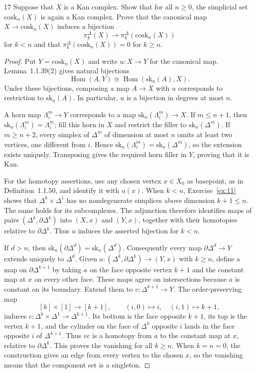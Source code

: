 \begin{exercise}{17}
Suppose that $X$ is a Kan complex. Show that for all $n\ge0$, the
simplicial set $\mathrm{cosk}_n(X)$ is again a Kan complex. Prove that
the canonical map $X\to\mathrm{cosk}_n(X)$ induces a bijection
\[
 \pi_k^\Delta(X)\to\pi_k^\Delta(\mathrm{cosk}_n(X))
\]
for $k<n$ and that $\pi_k^\Delta(\mathrm{cosk}_n(X))=0$ for $k\ge n$.

\begin{proof}
Put $Y=\mathrm{cosk}_n(X)$ and write $u\colon X\to Y$ for the
canonical map. Lemma~1.1.39(2) gives natural bijections
\[
 \operatorname{Hom}(A,Y)\cong
 \operatorname{Hom}(\mathrm{sk}_n(A),X).
\]
Under these bijections, composing a map $A\to X$ with $u$
corresponds to restriction to $\mathrm{sk}_n(A)$. In particular,
$u$ is a bijection in degrees at most $n$.

A horn map $\Lambda_i^m\to Y$ corresponds to a map
$\mathrm{sk}_n(\Lambda_i^m)\to X$.
If $m\le n+1$, then $\mathrm{sk}_n(\Lambda_i^m)=\Lambda_i^m$;
fill this horn in $X$ and restrict the filler to
$\mathrm{sk}_n(\Delta^m)$. If $m\ge n+2$, every simplex of
$\Delta^m$ of dimension at most $n$ omits at least two vertices,
one different from $i$. Hence
$\mathrm{sk}_n(\Lambda_i^m)=\mathrm{sk}_n(\Delta^m)$, so the
extension exists uniquely. Transposing gives the required horn
filler in $Y$, proving that it is Kan.

For the homotopy assertions, use any chosen vertex $x\in X_0$ as
basepoint, as in Definition~1.1.50, and identify it with $u(x)$.
When $k<n$, Exercise~\ref{ex:11} shows that
$\Delta^k\times\Delta^1$ has no nondegenerate simplices above
dimension $k+1\le n$. The same holds for its subcomplexes.
The adjunction therefore identifies maps of pairs
$(\Delta^k,\partial\Delta^k)$ into $(X,x)$ and $(Y,x)$, together
with their homotopies relative to $\partial\Delta^k$.
Thus $u$ induces the asserted bijection for $k<n$.

If $d>n$, then
$\mathrm{sk}_n(\partial\Delta^d)=\mathrm{sk}_n(\Delta^d)$.
Consequently every map $\partial\Delta^d\to Y$ extends uniquely
to $\Delta^d$.
Given $a\colon(\Delta^k,\partial\Delta^k)\to(Y,x)$ with $k\ge n$,
define a map on $\partial\Delta^{k+1}$ by taking $a$ on the face
opposite vertex $k+1$ and the constant map at $x$ on every other
face. These maps agree on intersections because $a$ is constant
on its boundary. Extend them to $v\colon\Delta^{k+1}\to Y$.
The order-preserving map
\[
 [k]\times[1]\longrightarrow[k+1],\qquad
 (i,0)\longmapsto i,\quad(i,1)\longmapsto k+1,
\]
induces $c\colon\Delta^k\times\Delta^1\to\Delta^{k+1}$.
Its bottom is the face opposite $k+1$, its top is the vertex
$k+1$, and the cylinder on the face of $\Delta^k$ opposite $i$
lands in the face opposite $i$ of $\Delta^{k+1}$.
Thus $vc$ is a homotopy from $a$ to the constant map at $x$,
relative to $\partial\Delta^k$. This proves the vanishing for all
$k\ge n$. When $k=n=0$, the construction gives an edge from every
vertex to the chosen $x$, so the vanishing means that the component
set is a singleton.
\end{proof}
\end{exercise}
